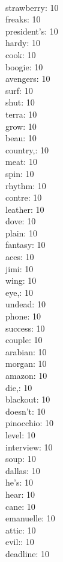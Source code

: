 \begin{multicols}{6}
  \\ strawberry: 10
  \\ freaks: 10
  \\ president's: 10
  \\ hardy: 10
  \\ cook: 10
  \\ boogie: 10
  \\ avengers: 10
  \\ surf: 10
  \\ shut: 10
  \\ terra: 10
  \\ grow: 10
  \\ beau: 10
  \\ country,: 10
  \\ meat: 10
  \\ spin: 10
  \\ rhythm: 10
  \\ contre: 10
  \\ leather: 10
  \\ dove: 10
  \\ plain: 10
  \\ fantasy: 10
  \\ aces: 10
  \\ jimi: 10
  \\ wing: 10
  \\ eye,: 10
  \\ undead: 10
  \\ phone: 10
  \\ success: 10
  \\ couple: 10
  \\ arabian: 10
  \\ morgan: 10
  \\ amazon: 10
  \\ die,: 10
  \\ blackout: 10
  \\ doesn't: 10
  \\ pinocchio: 10
  \\ level: 10
  \\ interview: 10
  \\ soup: 10
  \\ dallas: 10
  \\ he's: 10
  \\ hear: 10
  \\ cane: 10
  \\ emanuelle: 10
  \\ attic: 10
  \\ evil:: 10
  \\ deadline: 10

\end{multicols}
